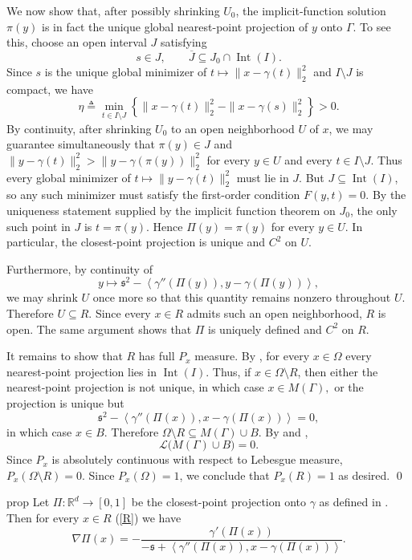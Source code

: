 \documentclass[11pt]{article}
\begin{document}
\begin{appendices}
We now show that, after possibly shrinking $U_0$, the implicit-function solution $\pi(y)$ is in fact the unique global nearest-point projection of $y$ onto $\Gamma$. To see this, choose an open interval $J$ satisfying
\[
    s\in J,
    \qquad
    \overline{J}\subseteq J_0\cap\operatorname{Int}(I).
\]
Since $s$ is the unique global minimizer of $t\mapsto\|x-\gamma(t)\|_2^2$ and $I\setminus J$ is compact, we have
\[
    \eta
    \triangleq
    \min_{t\in I\setminus J}
    \left\{
    \|x-\gamma(t)\|_2^2-\|x-\gamma(s)\|_2^2
    \right\}
    >0.
\]
By continuity, after shrinking $U_0$ to an open neighborhood $U$ of $x$, we may guarantee simultaneously that $\pi(y)\in J$ and
$\|y-\gamma(t)\|_2^2 > \|y-\gamma(\pi(y))\|_2^2$ for every $y\in U$ and every $t\in I\setminus J$. Thus every global minimizer of $t\mapsto\|y-\gamma(t)\|_2^2$ must lie in $J$. But $J\subseteq\operatorname{Int}(I)$, so any such minimizer must satisfy the first-order condition $F(y,t)=0.$ By the uniqueness statement supplied by the implicit function theorem on $J_0$, the only such point in $J$ is $t=\pi(y)$. Hence $\Pi(y)=\pi(y)$ for every $y\in U$. In particular, the closest-point projection is unique and $C^2$ on $U$.

Furthermore, by continuity of
\[
    y
    \mapsto 
    \mathfrak{s}^2
    -
    \left\langle
    \gamma''(\Pi(y)),
    y-\gamma(\Pi(y))
    \right\rangle,
\]
we may shrink $U$ once more so that this quantity remains nonzero throughout $U$. Therefore $U\subseteq R.$ Since every $x\in R$ admits such an open neighborhood, $R$ is open. The same argument shows that $\Pi$ is uniquely defined and $C^2$ on $R$.

It remains to show that $R$ has full $P_x$ measure. By , for every $x\in\Omega$ every nearest-point projection lies in $\operatorname{Int}(I)$. Thus, if $x\in\Omega\setminus R$, then either the nearest-point projection is not unique, in which case $x\in M(\Gamma),$ or the projection is unique but
\[
    \mathfrak{s}^2
    -
    \left\langle
    \gamma''(\Pi(x)),
    x-\gamma(\Pi(x))
    \right\rangle
    =0,
\]
in which case $x\in B$. Therefore $\Omega\setminus R \subseteq
    M(\Gamma)\cup B.$ By  and ,
\[
    \mathcal{L}\big(M(\Gamma)\cup B\big)=0.
\]
Since $P_x$ is absolutely continuous with respect to Lebesgue measure, $ P_x(\Omega\setminus R)=0.$ 
Since $P_x(\Omega)=1$, we conclude that $P_x(R)=1$ as desired.
\qed{}


\begin{restatable}{prop}{} \label{prop: proj gradient}
    Let $\Pi: \mathbb{R}^d \rightarrow [0, 1]$ be the closest-point projection onto $\gamma$ as defined in . Then for every $x \in R$ (\cref{R}) 
    we have 
    \[\nabla\Pi(x)  = -\frac{\gamma'(\Pi(x))}{-\mathfrak s + \left\langle\gamma''(\Pi(x)), x - \gamma(\Pi(x))\right\rangle}.\]
\end{restatable}


\end{appendices}
\end{document}
